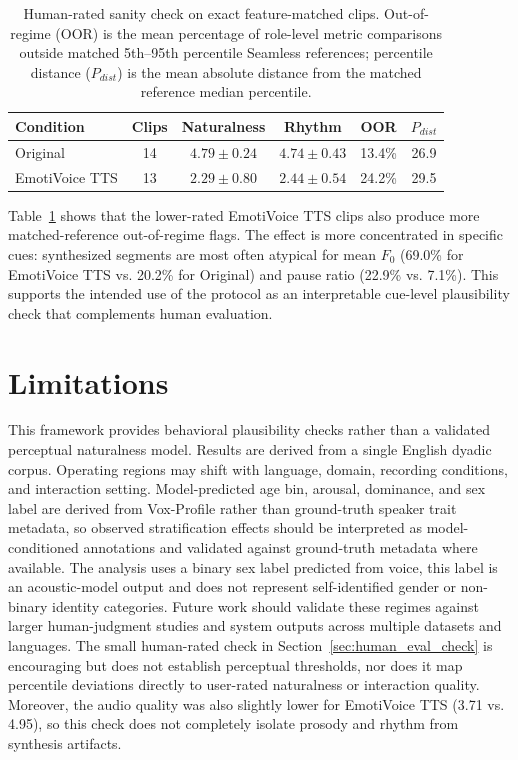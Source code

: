 \documentclass[conference]{IEEEtran}
\begin{document}
\begin{table}[t]
\centering
\caption{Human-rated sanity check on exact feature-matched clips. Out-of-regime (OOR) is the mean percentage of role-level metric comparisons outside matched 5th--95th percentile Seamless references; percentile distance ($P_{dist}$) is the mean absolute distance from the matched reference median percentile.}
\label{tab:human_eval_reference_check}
\small
\setlength{\tabcolsep}{3pt}
\begin{tabular}{l c c c c c}
\toprule
\textbf{Condition} & \textbf{Clips} & \textbf{Naturalness} & \textbf{Rhythm} & \textbf{OOR} & \textbf{$P_{dist}$} \\
\midrule
Original & 14 & $4.79 \pm 0.24$ & $4.74 \pm 0.43$ & 13.4\% & 26.9 \\
EmotiVoice TTS & 13 & $2.29 \pm 0.80$ & $2.44 \pm 0.54$ & 24.2\% & 29.5 \\
\bottomrule
\end{tabular}
\end{table}

Table~\ref{tab:human_eval_reference_check} shows that the lower-rated EmotiVoice TTS clips also produce more matched-reference out-of-regime flags. 
The effect is more concentrated in specific cues: synthesized segments are most often atypical for mean $F_0$ (69.0\% for EmotiVoice TTS vs. 20.2\% for Original) and pause ratio (22.9\% vs. 7.1\%). 
This supports the intended use of the protocol as an interpretable cue-level plausibility check that complements human evaluation.

\section{Limitations}\label{sec:limitations}
This framework provides behavioral plausibility checks rather than a validated perceptual naturalness model. 
Results are derived from a single English dyadic corpus. 
Operating regions may shift with language, domain, recording conditions, and interaction setting. 
Model-predicted age bin, arousal, dominance, and sex label are derived from Vox-Profile rather than ground-truth speaker trait metadata, so observed stratification effects should be interpreted as model-conditioned annotations and validated against ground-truth metadata where available.
The analysis uses a binary sex label predicted from voice, this label is an acoustic-model output and does not represent self-identified gender or non-binary identity categories.
Future work should validate these regimes against larger human-judgment studies and system outputs across multiple datasets and languages.
The small human-rated check in Section~\ref{sec:human_eval_check} is encouraging but does not establish perceptual thresholds, nor does it map percentile deviations directly to user-rated naturalness or interaction quality. 
Moreover, the audio quality was also slightly lower for EmotiVoice TTS (3.71 vs. 4.95), so this check does not completely isolate prosody and rhythm from synthesis artifacts. 
\end{document}
